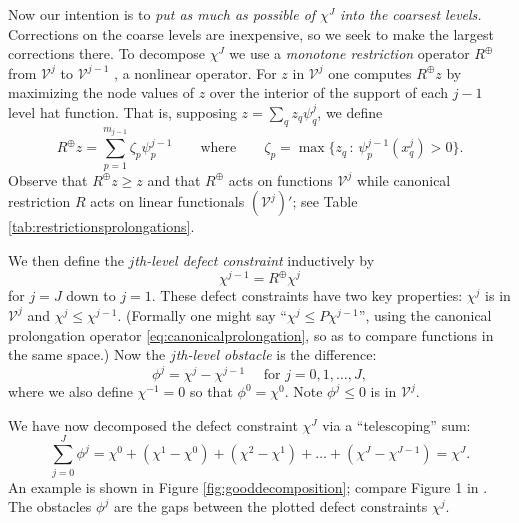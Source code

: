 \documentclass[letterpaper,final,12pt,reqno]{amsart}
\theoremstyle{claim}
\newcommand{\mR}{R^{\bm{\oplus}}}
\numberwithin{equation}{section}
\numberwithin{figure}{section}
\numberwithin{table}{section}
\numberwithin{theorem}{section}
\begin{document}
Now our intention is to \emph{put as much as possible of $\chi^J$ into the coarsest levels.}  Corrections on the coarse levels are inexpensive, so we seek to make the largest corrections there.  To decompose $\chi^J$ we use a \emph{monotone restriction} operator $\mR$ from $\mathcal{V}^j$ to $\mathcal{V}^{j-1}$ \cite[equation (4.22)]{GraeserKornhuber2009}, a nonlinear operator.  For $z$ in $\mathcal{V}^j$ one computes $\mR z$ by maximizing the node values of $z$ over the interior of the support of each $j-1$ level hat function.  That is, supposing $z = \sum_q z_q \psi_q^j$, we define
\begin{equation}
  \mR z = \sum_{p=1}^{m_{j-1}} \zeta_p \psi_p^{j-1} \qquad \text{where} \qquad \zeta_p = \max \{z_q \,:\, \psi_p^{j-1}(x_q^j) > 0\}.  \label{eq:monotonerestriction}
\end{equation}
Observe that $\mR z \ge z$ and that $\mR$ acts on functions $\mathcal{V}^j$ while canonical restriction $R$ acts on linear functionals $(\mathcal{V}^j)'$; see Table \ref{tab:restrictionsprolongations}.

We then define the \emph{$j$th-level defect constraint} inductively by
\begin{equation}
  \chi^{j-1} = \mR \chi^j  \label{eq:chik}
\end{equation}
for $j=J$ down to $j=1$.  These defect constraints have two key properties: $\chi^j$ is in $\mathcal{V}^j$ and $\chi^j \le \chi^{j-1}$.  (Formally one might say ``$\chi^j \le P \chi^{j-1}$'', using the canonical prolongation operator \eqref{eq:canonicalprolongation}, so as to compare functions in the same space.)  Now the \emph{$j$th-level obstacle} is the difference:
\begin{equation}
  \phi^j = \chi^j - \chi^{j-1} \quad \text{ for } j=0,1,\dots,J,  \label{eq:levelobstacle}
\end{equation}
where we also define $\chi^{-1}=0$ so that $\phi^0 = \chi^0$.  Note $\phi^j\le 0$ is in $\mathcal{V}^j$.

We have now decomposed the defect constraint $\chi^J$ via a ``telescoping'' sum:
\begin{equation}
  \sum_{j=0}^J \phi^j = \chi^0 + (\chi^1 - \chi^0) + (\chi^2 - \chi^1) + \dots + (\chi^J - \chi^{J-1}) = \chi^J.  \label{eq:telescopingdecomposition}
\end{equation}
An example is shown in Figure \ref{fig:gooddecomposition}; compare Figure 1 in \cite{GraeserKornhuber2009}.  The obstacles $\phi^j$ are the gaps between the plotted defect constraints $\chi^j$.
\end{document}
